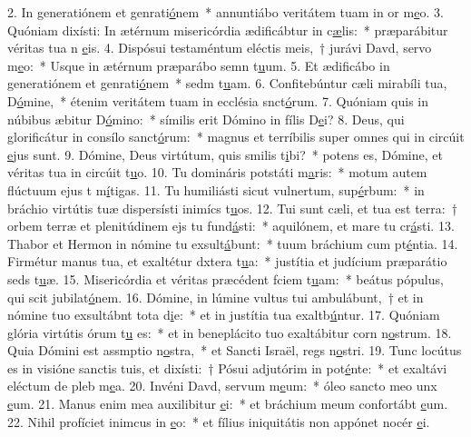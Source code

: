 2. In generatiónem et genrati\uline{ó}nem~* annuntiábo veritátem tuam in or m\uline{e}o.
3. Quóniam dixísti: In ætérnum misericórdia ædificábtur in c\uline{æ}lis:~* præparábitur véritas tua n \uline{e}is.
4. Dispósui testaméntum eléctis meis,~† jurávi Davd, servo m\uline{e}o:~* Usque in ætérnum præparábo semn t\uline{u}um.
5. Et ædificábo in generatiónem et genrati\uline{ó}nem~* sedm t\uline{u}am.
6. Confitebúntur cæli mirabíli tua, D\uline{ó}mine,~* étenim veritátem tuam in ecclésia snct\uline{ó}rum.
7. Quóniam quis in núbibus æbitur D\uline{ó}mino:~* símilis erit Dómino in fílis D\uline{e}i?
8. Deus, qui glorificátur in consílo sanct\uline{ó}rum:~* magnus et terríbilis super omnes qui in circúit \uline{e}jus sunt.
9. Dómine, Deus virtútum, quis smilis t\uline{i}bi?~* potens es, Dómine, et véritas tua in circúit t\uline{u}o.
10. Tu domináris potstáti m\uline{a}ris:~* motum autem flúctuum ejus t m\uline{í}tigas.
11. Tu humiliásti sicut vulnertum, sup\uline{é}rbum:~* in bráchio virtútis tuæ dispersísti inimícs t\uline{u}os.
12. Tui sunt cæli, et tua est terra:~† orbem terræ et plenitúdinem ejs tu fund\uline{á}sti:~* aquilónem, et mare tu cr\uline{á}sti.
13. Thabor et Hermon in nómine tu exsult\uline{á}bunt:~* tuum bráchium cum pt\uline{é}ntia.
14. Firmétur manus tua, et exaltétur dxtera t\uline{u}a:~* justítia et judícium præparátio seds t\uline{u}æ.
15. Misericórdia et véritas præcédent fciem t\uline{u}am:~* beátus pópulus, qui scit jubilat\uline{ó}nem.
16. Dómine, in lúmine vultus tui ambulábunt,~† et in nómine tuo exsultábnt tota d\uline{i}e:~* et in justítia tua exaltb\uline{ú}ntur.
17. Quóniam glória virtútis órum t\uline{u} es:~* et in beneplácito tuo exaltábitur corn n\uline{o}strum.
18. Quia Dómini est assmptio n\uline{o}stra,~* et Sancti Israël, regs n\uline{o}stri.
19. Tunc locútus es in visióne sanctis tuis, et dixísti:~† Pósui adjutórim in pot\uline{é}nte:~* et exaltávi eléctum de pleb m\uline{e}a.
20. Invéni Davd, servum m\uline{e}um:~* óleo sancto meo unx \uline{e}um.
21. Manus enim mea auxilibitur \uline{e}i:~* et bráchium meum confortábt \uline{e}um.
22. Nihil profíciet inimcus in \uline{e}o:~* et fílius iniquitátis non appónet nocér \uline{e}i.
